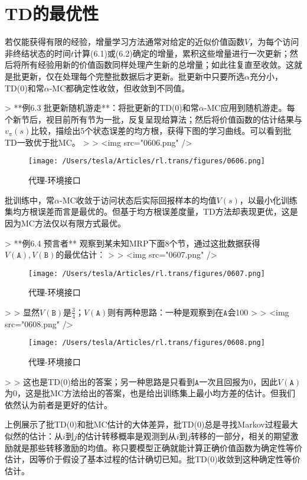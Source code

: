 \documentclass{ctexart}
\begin{document}
\section{TD的最优性}

若仅能获得有限的经验，增量学习方法通常对给定的近似价值函数$V$，为每个访问非终结状态的时间$t$计算(6.1)或(6.2)确定的增量，累积这些增量进行一次更新；然后将所有经验用新的价值函数同样处理产生新的总增量；如此往复直至收敛。这就是批更新，仅在处理每个完整批数据后才更新。批更新中只要所选$\alpha$充分小，TD(0)和常$\alpha$-MC都确定性收敛，但收敛到不同值。

> **例6.3 批更新随机游走**：将批更新的TD(0)和常$\alpha$-MC应用到随机游走。每个新节后，视目前所有节为一批，反复呈现给算法；然后将价值函数的估计结果与$v_\pi(s)$比较，描绘出5个状态误差的均方根，获得下图的学习曲线。可以看到批TD一致优于批MC。
>
> <img src="0606.png" />
\begin{figure}[htbp]
    \centering
    \texttt{[image: /Users/tesla/Articles/rl.trans/figures/0606.png]}
    \caption{代理-环境接口}
    \label{fig:0606} 
\end{figure}

批训练中，常$\alpha$-MC收敛于访问状态后实际回报样本的均值$V(s)$，以最小化训练集均方根误差而言是最优的。但基于均方根误差度量，TD方法却表现更优，这是因为MC方法仅以有限方式最优。

> **例6.4 预言者** 观察到某未知MRP下面8个节，通过这批数据获得$V(\mathtt A),V(\mathtt B)$的最优估计：
>
> <img src="0607.png" />
\begin{figure}[htbp]
    \centering
    \texttt{[image: /Users/tesla/Articles/rl.trans/figures/0607.png]}
    \caption{代理-环境接口}
    \label{fig:0607} 
\end{figure}
>
> 显然$V(\mathtt B)$是$\frac34$；$V(\mathtt A)$则有两种思路：一种是观察到在$\mathtt A$会100%
>
> <img src="0608.png" />
\begin{figure}[htbp]
    \centering
    \texttt{[image: /Users/tesla/Articles/rl.trans/figures/0608.png]}
    \caption{代理-环境接口}
    \label{fig:0608} 
\end{figure}
>
> 这也是TD(0)给出的答案；另一种思路是只看到$\mathtt A$一次且回报为0，因此$V(\mathtt A)$为0，这是批MC方法给出的答案，也是给出训练集上最小均方差的估计。但我们依然认为前者是更好的估计。

上例展示了批TD(0)和批MC估计的大体差异，批TD(0)总是寻找Markov过程最大似然的估计：从$i$到$j$的估计转移概率是观测到从$i$到$j$转移的一部分，相关的期望激励就是那些转移激励的均值。称只要模型正确就能计算正确价值函数为确定性等价估计，因等价于假设了基本过程的估计确切已知。批TD(0)收敛到这种确定性等价估计。
\end{document}
